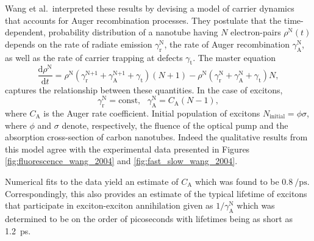 Wang et al.\ interpreted these results by devising a model of carrier dynamics that accounts for Auger recombination processes. They postulate that the time-dependent, probability distribution of a nanotube having $N$ electron-pairs $\rho^\text{N}(t)$ depends on the rate of radiate emission $\gamma^\text{N}_\text{r}$, the rate of Auger recombination $\gamma^\text{N}_\text{A}$, as well as the rate of carrier trapping at defects $\gamma_\text{t}$. The master equation
\begin{equation}
	\dfrac{\mathrm{d}\rho^\text{N}}{\mathrm{d} t} = \rho^\text{N}(\gamma^\text{N+1}_\text{r} + \gamma^\text{N+1}_\text{A} + \gamma_\text{t})(N+1) - \rho^\text{N}(\gamma^\text{N}_\text{r} + \gamma^\text{N}_\text{A} + \gamma_\text{t})N,
\end{equation}
captures the relationship between these quantities. In the case of excitons,
\begin{equation}
	\gamma^\text{N}_\text{r} = \text{const}, \text{   } \gamma^\text{N}_\text{A} = C_\text{A}(N-1),
\end{equation}
where $C_\text{A}$ is the Auger rate coefficient. Initial population of excitons $N_\text{initial} = \phi \sigma$, where $\phi$ and $\sigma$ denote, respectively, the fluence of the optical pump and the absorption cross-section of carbon nanotubes. Indeed the qualitative results from this model agree with the experimental data presented in Figures \ref{fig:fluorescence_wang_2004} and \ref{fig:fast_slow_wang_2004}.



Numerical fits to the data yield an estimate of $C_\text{A}$ which was found to be $\SI{0.8}{\per\pico\second}$. Correspondingly, this also provides an estimate of the typical lifetime of excitons that participate in exciton-exciton annihilation given as $1/\gamma^\text{N}_\text{A}$ which was determined to be on the order of picoseconds with lifetimes being as short as \SI{1.2}{\pico \second}.





